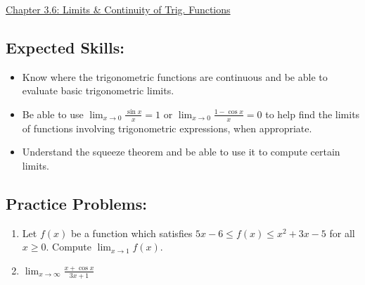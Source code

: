\documentclass[12pt]{article}
\newif\ifans
\begin{document}
\begin{center}
\underline{\LARGE{Chapter 3.6: Limits \& Continuity of Trig. Functions}}
\end{center}

\subsection*{Expected Skills:}

\begin{itemize}

\item Know where the trigonometric functions are continuous and be able to evaluate basic trigonometric limits.

\item Be able to use $\lim_{x\rightarrow0}\frac{\sin{x}}{x}=1$ or $\lim_{x \rightarrow 0}\frac{1-\cos{x}}{x}=0$ to help find the limits of functions involving trigonometric expressions, when appropriate.

\item Understand the squeeze theorem and be able to use it to compute certain limits.

\end{itemize}

\subsection*{Practice Problems: }


\begin{enumerate}

\item Let $f(x)$ be a function which satisfies $\displaystyle 5x-6 \leq f(x) \leq x^2+3x-5$ for all $x \geq 0$.  Compute $\displaystyle \lim_{x \rightarrow 1}{f(x)}$.

\ifans{\fbox{$-1$}} \fi

\item $\lim_{x\to\infty} \frac{x+\cos{x}}{3x+1}$

\ifans{\fbox{\parbox{1\linewidth}{Notice that $f(x)=\frac{x+\cos{x}}{3x+1}$ can be bounded as follows: $$\frac{x-1}{3x+1} \leq \frac{x+\cos{x}}{3x+1} \leq \frac{x+1}{3x+1}$$  Since $\lim_{x\to\infty} \frac{x-1}{3x+1}=\lim_{x\to\infty}  \frac{x+1}{3x+1}=\frac{1}{3}$, it follows that $\lim_{x\to\infty}  \frac{x+\cos{x}}{3x+1}=\frac{1}{3}$.}}} \fi

\end{enumerate}
\end{document}
